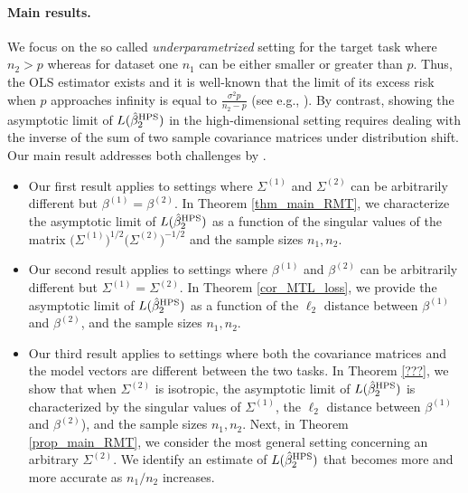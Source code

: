 \paragraph{Main results.} We focus on the so called \textit{underparametrized} setting for the target task where $n_2 > p$ whereas for dataset one $n_1$ can be either smaller or greater than $p$.
Thus, the OLS estimator exists and it is well-known that the limit of its excess risk when $p$ approaches infinity is equal to $\frac{\sigma^2 p}{n_2 - p}$ (see e.g., \citet{bai2009spectral}).
By contrast, showing the asymptotic limit of $L(\hat{\beta}^{\textup{HPS}}_2)$ in the high-dimensional setting requires dealing with the inverse of the sum of two sample covariance matrices under distribution shift.
Our main result addresses both challenges by .
\begin{itemize}
    \item %
    Our first result applies to settings where $\Sigma^{(1)}$ and $\Sigma^{(2)}$ can be arbitrarily different but $\beta^{(1)} = \beta^{(2)}$.
    In Theorem \ref{thm_main_RMT}, we characterize the asymptotic limit of $L(\hat{\beta}_2^{\textup{HPS}})$ as a function of the singular values of the matrix $\big(\Sigma^{(1)}\big)^{1/2}\big(\Sigma^{(2)}\big)^{-1/2}$ and the sample sizes $n_1, n_2$.
    \item %
    Our second result applies to settings where $\beta^{(1)}$ and $\beta^{(2)}$ can be arbitrarily different but $\Sigma^{(1)} = \Sigma^{(2)}$.
    In Theorem \ref{cor_MTL_loss}, we provide the asymptotic limit of $L(\hat{\beta}_2^{\textup{HPS}})$ as a function of the $\ell_2$ distance between $\beta^{(1)}$ and $\beta^{(2)}$, and the sample sizes $n_1, n_2$.
    \item %
    Our third result applies to settings where both the covariance matrices and the model vectors are different between the two tasks.
    In Theorem \ref{???}, we show that when $\Sigma^{(2)}$ is isotropic, the asymptotic limit of $L(\hat{\beta}_2^{\textup{HPS}})$ is characterized by the singular values of $\Sigma^{(1)}$, the $\ell_2$ distance between $\beta^{(1)}$ and $\beta^{(2)}$), and the sample sizes $n_1, n_2$.
    Next, in Theorem \ref{prop_main_RMT}, we consider the most general setting concerning an arbitrary $\Sigma^{(2)}$. We identify an estimate of $L(\hat{\beta}_2^{\textup{HPS}})$ that becomes more and more accurate as $n_1 / n_2$ increases.
\end{itemize}

